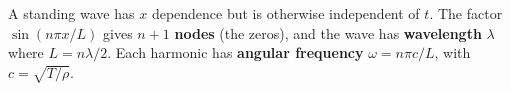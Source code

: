 \documentclass[letter-paper]{tufte-book}
\newcommand\Def[1]{\textbf{#1}}
\begin{document}
A standing wave has $x$ dependence but is otherwise independent of $t$. The
factor $\sin(n\pi x / L)$ gives $n+1$ \Def{nodes} (the zeros), and the
wave has \Def{wavelength} $\lambda$ where $L = n\lambda / 2$. Each
harmonic has \Def{angular frequency} $\omega = n\pi c/ L$, with $c =
\sqrt{T / \rho}$.








\mainmatter




%


\end{document}
